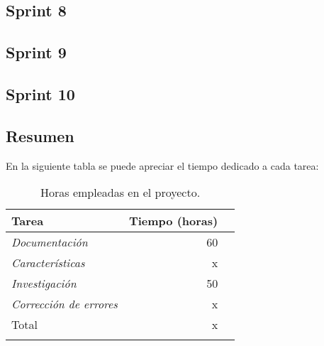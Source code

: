\subsection{Sprint 8}
\subsection{Sprint 9}
\subsection{Sprint 10}

\subsection{Resumen}
En la siguiente tabla se puede apreciar el tiempo dedicado a cada tarea:


\begin{longtable}[]{@{}lrr@{}}
\toprule
\begin{minipage}[b]{0.37\columnwidth}\raggedright\strut
Tarea\strut
\end{minipage} & \begin{minipage}[b]{0.37\columnwidth}\raggedleft\strut
Tiempo (horas)\strut
\end{minipage}\tabularnewline
\midrule
\endhead
\begin{minipage}[t]{0.37\columnwidth}\raggedright\strut
\emph{Documentación}\strut
\end{minipage} & \begin{minipage}[t]{0.37\columnwidth}\raggedleft\strut
60\strut
\end{minipage}\tabularnewline
\begin{minipage}[t]{0.37\columnwidth}\raggedright\strut
\emph{Características}\strut
\end{minipage} & \begin{minipage}[t]{0.37\columnwidth}\raggedleft\strut
x\strut
\end{minipage}\tabularnewline
\begin{minipage}[t]{0.37\columnwidth}\raggedright\strut
\emph{Investigación}\strut
\end{minipage}& \begin{minipage}[t]{0.37\columnwidth}\raggedleft\strut
50\strut
\end{minipage}\tabularnewline
\begin{minipage}[t]{0.37\columnwidth}\raggedright\strut
\emph{Corrección de errores}\strut
\end{minipage} & \begin{minipage}[t]{0.37\columnwidth}\raggedleft\strut
x\strut
\end{minipage}\tabularnewline
\midrule
\begin{minipage}[t]{0.37\columnwidth}\raggedright\strut
Total\strut
\end{minipage} & \begin{minipage}[t]{0.37\columnwidth}\raggedleft\strut
x\strut
\end{minipage}\tabularnewline
\bottomrule
\caption{Horas empleadas en el proyecto.}
\end{longtable}




